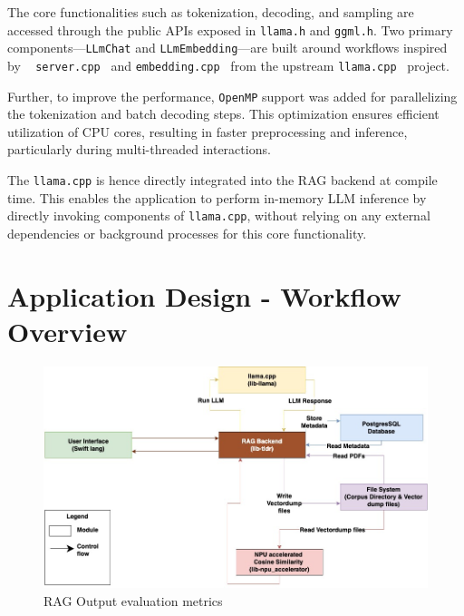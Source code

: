 The core functionalities such as tokenization, decoding, and sampling are accessed through the public APIs exposed in \texttt{llama.h} and \texttt{ggml.h}. Two primary components—\texttt{LLmChat} and \texttt{LLmEmbedding}—are built around workflows inspired by ~\cite{llama_simple} \texttt{server.cpp}~\cite{llama_server} and \texttt{embedding.cpp}~\cite{llama_embedding} from the upstream \texttt{llama.cpp}~\cite{llamacpp} project. 

Further, to improve the performance, \texttt{OpenMP} support was added for parallelizing the tokenization and batch decoding steps. This optimization ensures efficient utilization of CPU cores, resulting in faster preprocessing and inference, particularly during multi-threaded interactions.

The \texttt{llama.cpp} is hence directly integrated into the RAG backend at compile time. This enables the application to perform in-memory LLM inference by directly invoking components of \texttt{llama.cpp}, without relying on any external dependencies or background processes for this core functionality.
\section{Application Design - Workflow Overview}
\label{subsec:AppDesignWorkflow-Overview}

\begin{figure}[H]
    \centering
    \includegraphics[width=1.0\linewidth]{images/tldr-app-module-interactions.jpg}
    \caption{RAG Output evaluation metrics ~\cite{cardenas2023rag}}
    \label{fig:autoregressive_decoding}
\end{figure}



